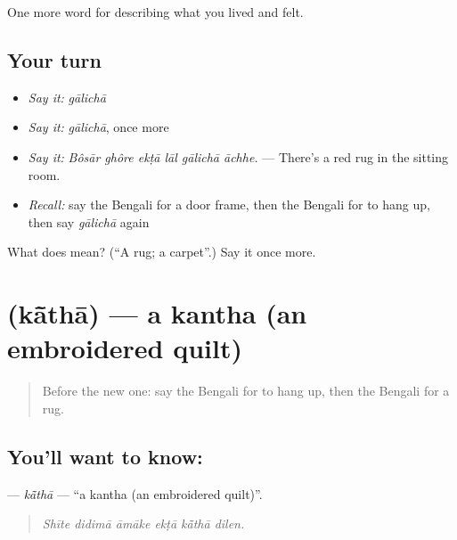 \begin{grammarlens}[title={What you've built}]
One more word for describing what you lived and felt.
\end{grammarlens}

\subsection*{Your turn}
\begin{itemize}
\raggedright
  \item \emph{Say it:} \emph{gālichā}
  \item \emph{Say it:} \emph{gālichā}, once more
  \item \emph{Say it:} \emph{Bôsār ghôre ekṭā lāl gālichā āchhe.} — There's a red rug in the sitting room.
  \item \emph{Recall:} say the Bengali for a door frame, then the Bengali for to hang up, then say \emph{gālichā} again
\end{itemize}

\begin{tcolorbox}[breakable,colback=teal!4,colframe=teal!35!black,title={Before you move on}]
What does  mean? (\textquotedblleft{}A rug; a carpet\textquotedblright{}.) Say it once more.
\end{tcolorbox}
\section[\texorpdfstring{\bn{কাঁথা} (kā̃thā)}{কাঁথা (kā̃thā)}]{ (kā̃thā) — a kantha (an embroidered quilt)}

\label{lesson:BN-C509-katha}



\begin{quote}
Before the new one: say the Bengali for to hang up, then the Bengali for a rug.
\end{quote}

\subsection*{You'll want to know: }
\textbf{} — \emph{kā̃thā} — \textquotedblleft{}a kantha (an embroidered quilt)\textquotedblright{}.

\begin{quote}
     
\end{quote}

\begin{quote}
\emph{Shīte didimā āmāke ekṭā kā̃thā dilen.}
\end{quote}

